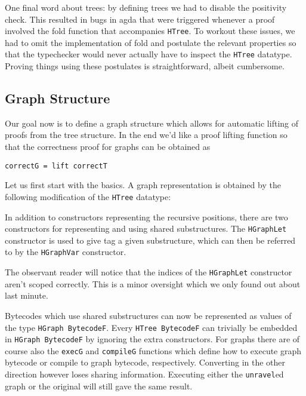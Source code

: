 \documentclass[a4paper]{article}
\begin{document}
        
        
        One final word about trees: by defining trees we had to disable the positivity check. This resulted in bugs in agda that were triggered 
        whenever a proof involved the fold function that accompanies \texttt{HTree}. To workout these issues, we had to omit the implementation of fold
        and postulate the relevant properties so that the typechecker would never actually have to inspect the \texttt{HTree} datatype. Proving things using
        these postulates is straightforward, albeit cumbersome.  
        
        \subsection{Graph Structure}
        
        Our goal now is to define a graph structure which allows for automatic lifting of proofs from the tree structure. In the end we'd like a proof lifting
        function so that the correctness proof for graphs can be obtained as
        \begin{verbatim}
correctG = lift correctT
        \end{verbatim}
        
        Let us first start with the basics. A graph representation is obtained by the following modification of the \texttt{HTree} datatype:
        
        
        In addition to constructors representing the recursive positions, there are two constructors for representing and using shared substructures.
        The \texttt{HGraphLet} constructor is used to give tag a given substructure, which can then be referred to by the \texttt{HGraphVar} constructor. 
        
        The observant reader will notice that the indices of the \texttt{HGraphLet} constructor aren't scoped correctly. This is a minor oversight which we only
        found out about last minute. 
        
        Bytecodes which use shared substructures can now be represented as values of the type \texttt{HGraph BytecodeF}. Every \texttt{HTree BytecodeF} 
        can trivially be embedded in \texttt{HGraph BytecodeF} by ignoring the extra constructors. For graphs there are of course also the
        \texttt{execG} and \texttt{compileG} functions which define how to execute graph bytecode or compile to graph bytecode, respectively. Converting in the other direction however loses sharing
        information. Executing either the \texttt{unravel}ed graph or the original will still gave the same result. 
        
\end{document}
